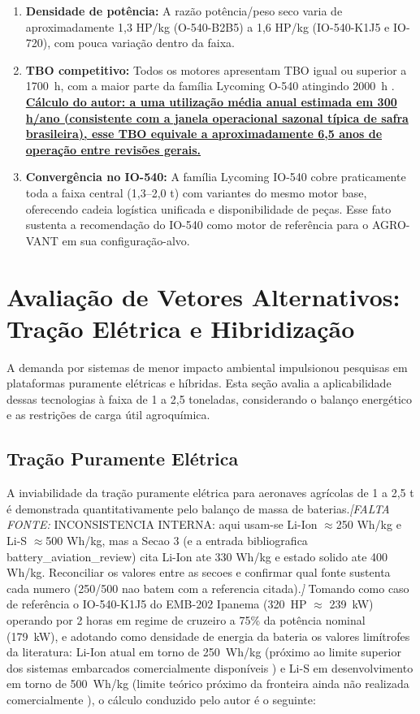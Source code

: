 \documentclass[a4paper,12pt]{article}
\newcommand{\autoeval}[1]{\textbf{\underline{#1}}}
\newcommand{\citesugerida}[1]{{\color{red}\textit{[FALTA FONTE: }#1\textit{]}}}
\begin{document}
\begin{enumerate}
    \item \textbf{Densidade de potência:} A razão potência/peso seco varia de aproximadamente 1{,}3 HP/kg (O-540-B2B5) a 1{,}6 HP/kg (IO-540-K1J5 e IO-720), com pouca variação dentro da faixa.
    \item \textbf{TBO competitivo:} Todos os motores apresentam TBO igual ou superior a \SI{1700}{h}, com a maior parte da família Lycoming O-540 atingindo \SI{2000}{h} \cite{lycomingmanual}. \autoeval{Cálculo do autor: a uma utilização média anual estimada em 300 h/ano (consistente com a janela operacional sazonal típica de safra brasileira), esse TBO equivale a aproximadamente 6{,}5 anos de operação entre revisões gerais.}
    \item \textbf{Convergência no IO-540:} A família Lycoming IO-540 cobre praticamente toda a faixa central (1{,}3--2{,}0 t) com variantes do mesmo motor base, oferecendo cadeia logística unificada e disponibilidade de peças. Esse fato sustenta a recomendação do IO-540 como motor de referência para o AGRO-VANT em sua configuração-alvo.
\end{enumerate}

\section{Avaliação de Vetores Alternativos: Tração Elétrica e Hibridização}

A demanda por sistemas de menor impacto ambiental impulsionou pesquisas em plataformas puramente elétricas e híbridas. Esta seção avalia a aplicabilidade dessas tecnologias à faixa de 1 a 2{,}5 toneladas, considerando o balanço energético e as restrições de carga útil agroquímica.

\subsection{Tração Puramente Elétrica}

A inviabilidade da tração puramente elétrica para aeronaves agrícolas de 1 a 2{,}5 t é demonstrada quantitativamente pelo balanço de massa de baterias.\citesugerida{INCONSISTENCIA INTERNA: aqui usam-se Li-Ion $\approx$250 Wh/kg e Li-S $\approx$500 Wh/kg, mas a Secao 3 (e a entrada bibliografica battery\_aviation\_review) cita Li-Ion ate 330 Wh/kg e estado solido ate 400 Wh/kg. Reconciliar os valores entre as secoes e confirmar qual fonte sustenta cada numero (250/500 nao batem com a referencia citada).} Tomando como caso de referência o IO-540-K1J5 do EMB-202 Ipanema (\SI{320}{HP} $\approx$ \SI{239}{kW}) operando por 2 horas em regime de cruzeiro a 75\% da potência nominal (\SI{179}{kW}), e adotando como densidade de energia da bateria os valores limítrofes da literatura: Li-Ion atual em torno de \SI{250}{Wh/kg} (próximo ao limite superior dos sistemas embarcados comercialmente disponíveis \cite{battery_aviation_review, aerospace_america_batteries}) e Li-S em desenvolvimento em torno de \SI{500}{Wh/kg} (limite teórico próximo da fronteira ainda não realizada comercialmente \cite{battery_aviation_review}), o cálculo conduzido pelo autor é o seguinte:
\end{document}
